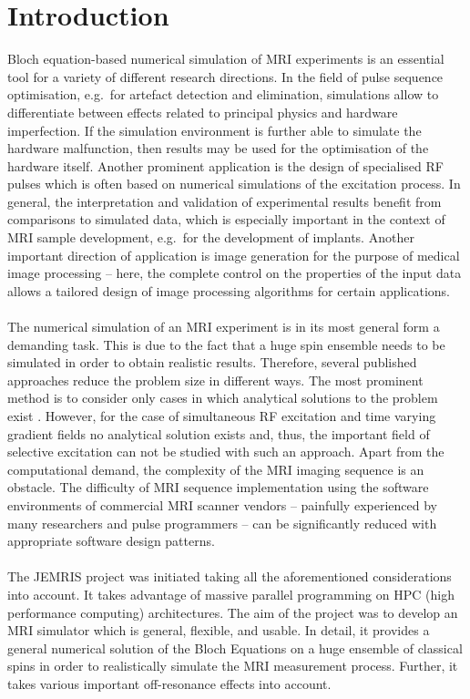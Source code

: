 \documentclass{nic-series}
\begin{document}
\section{Introduction}
Bloch equation-based numerical simulation of MRI experiments is an essential tool for a variety of different research directions.
In the field of pulse sequence optimisation, e.g.~for artefact detection and elimination, simulations allow to
differentiate between effects related to principal physics and hardware imperfection. If the simulation environment
is further able to simulate the hardware malfunction, then results may be used for the optimisation of the hardware
itself. Another prominent application is the design of specialised RF pulses which is often based on numerical simulations
of the excitation process. In general, the interpretation and validation of experimental results benefit from comparisons
to simulated data, which is especially important in the context of MRI sample development, e.g.~for the development of implants.
Another important direction of application is image generation for the purpose of medical image processing -- here, the complete
control on the properties of the input data allows a tailored design of image processing algorithms for certain applications.\\
\ \\
The numerical simulation of an MRI experiment is in its most general form a demanding task. This is due to the fact that a huge
spin ensemble needs to be simulated in order to obtain realistic results. Therefore, several published approaches reduce the
problem size in different ways. The most prominent method is to consider only cases in which analytical solutions to the
problem exist \cite{benoit}. However, for the case of simultaneous RF excitation and time varying gradient fields no
analytical solution exists and, thus, the important field of selective excitation can not be studied with such an approach.
Apart from the computational demand, the complexity of the MRI imaging sequence is an obstacle. The difficulty of MRI
sequence implementation using the software environments of commercial MRI scanner vendors -- painfully experienced by many
researchers and pulse programmers -- can be significantly reduced with appropriate software design patterns.\\
\ \\
The JEMRIS project was initiated taking all the aforementioned considerations into account. It takes advantage of massive
parallel programming on HPC (high performance computing) architectures.
The aim of the project was to develop an MRI simulator which is general, flexible, and usable. In detail, it provides
a general numerical solution of the Bloch Equations on a huge ensemble of classical spins in order to realistically simulate
the MRI measurement process. Further, it takes various important off-resonance effects into account.
\end{document}
